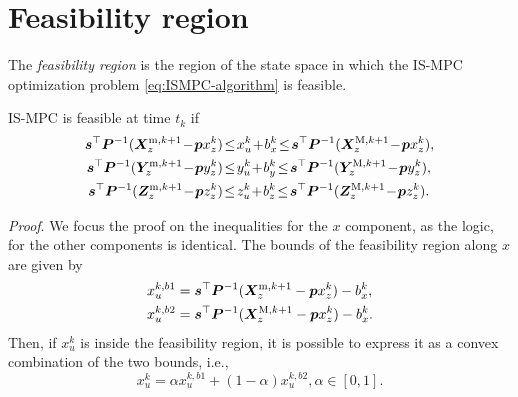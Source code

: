 \section{Feasibility region}
\label{sec:ISMPC:feasibility-region}

The {\em feasibility region} is the region of the state space in which the
IS-MPC optimization problem \eqref{eq:ISMPC-algorithm} is feasible.

\begin{proposition}
\label{prop:feasibility}
IS-MPC is feasible at time $t_k$ if
\begin{align}
\label{eq:FAPA:mpc-feasibility-constraint}
\bm{s}^\top \bm{P}^{-1} (\bm{X}_z^{{\rm m}, k+1} \!-\! \bm{p} x_z^k)  \!&\le\! x_u^k \!+\! b_x^k \!\le\! \bm{s}^\top \bm{P}^{-1} (\bm{X}_z^{{\rm M}, k+1} \!-\! \bm{p} x_z^k),
\nonumber\\
\bm{s}^\top \bm{P}^{-1} (\bm{Y}_z^{{\rm m}, k+1} \!-\! \bm{p} y_z^k)  \!&\le\! y_u^k \!+\! b_y^k \!\le\! \bm{s}^\top \bm{P}^{-1} (\bm{Y}_z^{{\rm M}, k+1} \!-\! \bm{p} y_z^k),
\nonumber\\
\bm{s}^\top \bm{P}^{-1} (\bm{Z}_z^{{\rm m}, k+1} \!-\! \bm{p} z_z^k)  \!&\le\! z_u^k \!+\! b_z^k \!\le\! \bm{s}^\top \bm{P}^{-1} (\bm{Z}_z^{{\rm M}, k+1} \!-\! \bm{p} z_z^k).
\end{align}
\end{proposition}
{\em Proof}.
We focus the proof on the inequalities for the $x$ component, as the logic, for
the other components is identical. The bounds of the feasibility region along
$x$ are given by
\begin{align*}
x_u^{k,b1} &= \bm{s}^\top \bm{P}^{-1} (\bm{X}_z^{{\rm m}, k+1} - \bm{p} x_z^k) - b_x^k, \\
x_u^{k,b2} &= \bm{s}^\top \bm{P}^{-1} (\bm{X}_z^{{\rm M}, k+1} - \bm{p} x_z^k) - b_x^k.
\end{align*}
Then, if $x_u^k$ is inside the feasibility region, it is possible to express
it as a convex combination of the two bounds, i.e.,
\begin{equation}\label{eq:FAPA:xu_convex}
x_u^k = \alpha x_u^{k,b1} + (1-\alpha)x_u^{k,b2}, \alpha \in [0, 1].
\end{equation}


